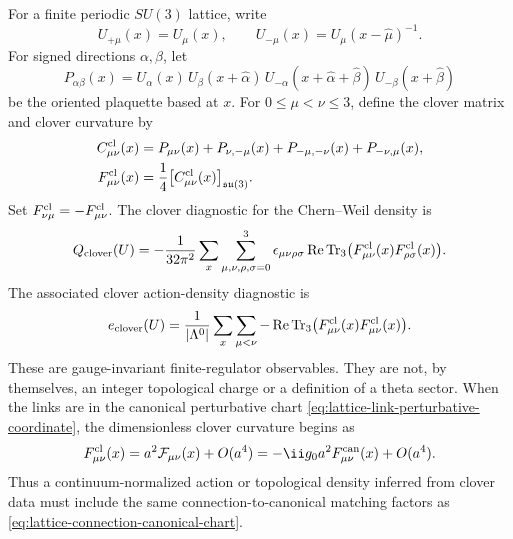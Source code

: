 \begin{definition}
\label{def:su3-clover-topological-charge-diagnostic}
For a finite periodic \(SU(3)\) lattice, write
\[
  U_{+\mu}(x)=U_\mu(x),
  \qquad
  U_{-\mu}(x)=U_\mu(x-\widehat\mu)^{-1}.
\]
For signed directions \(\alpha,\beta\), let
\[
  P_{\alpha\beta}(x)
  =
  U_\alpha(x)\,
  U_\beta(x+\widehat\alpha)\,
  U_{-\alpha}(x+\widehat\alpha+\widehat\beta)\,
  U_{-\beta}(x+\widehat\beta)
\]
be the oriented plaquette based at \(x\).  For \(0\le\mu<\nu\le3\), define
the clover matrix and clover curvature by
\begin{align}
  C_{\mu\nu}^{\rm cl}(x)
  &=
  P_{\mu\nu}(x)
  +P_{\nu,-\mu}(x)
  +P_{-\mu,-\nu}(x)
  +P_{-\nu,\mu}(x),
  \label{eq:su3-clover-matrix}\\
  F_{\mu\nu}^{\rm cl}(x)
  &=
  \frac14\bigl[C_{\mu\nu}^{\rm cl}(x)\bigr]_{\mathfrak{su}(3)}.
  \label{eq:su3-clover-curvature}
\end{align}
Set \(F_{\nu\mu}^{\rm cl}=-F_{\mu\nu}^{\rm cl}\).  The clover diagnostic for
the Chern--Weil density is
\begin{equation}
  Q_{\rm clover}(U)
  =
  -\frac{1}{32\pi^2}
  \sum_x\sum_{\mu,\nu,\rho,\sigma=0}^3
  \epsilon_{\mu\nu\rho\sigma}
  \operatorname{Re}\operatorname{Tr}_3
  \bigl(F_{\mu\nu}^{\rm cl}(x)F_{\rho\sigma}^{\rm cl}(x)\bigr).
  \label{eq:su3-clover-topological-charge}
\end{equation}
The associated clover action-density diagnostic is
\[
  e_{\rm clover}(U)
  =
  \frac1{|\Lambda^0|}
  \sum_x\sum_{\mu<\nu}
  -\operatorname{Re}\operatorname{Tr}_3
  \bigl(F_{\mu\nu}^{\rm cl}(x)F_{\mu\nu}^{\rm cl}(x)\bigr).
\]
These are gauge-invariant finite-regulator observables.  They are not, by
themselves, an integer topological charge or a definition of a theta sector.
When the links are in the canonical perturbative chart
\eqref{eq:lattice-link-perturbative-coordinate}, the dimensionless clover
curvature begins as
\[
  F_{\mu\nu}^{\rm cl}(x)
  =
  a^2\mathcal F_{\mu\nu}(x)+O(a^4)
  =
  -\ii g_0a^2F_{\mu\nu}^{\rm can}(x)+O(a^4).
\]
Thus a continuum-normalized action or topological density inferred from clover
data must include the same connection-to-canonical matching factors as
\eqref{eq:lattice-connection-canonical-chart}.
\end{definition}

